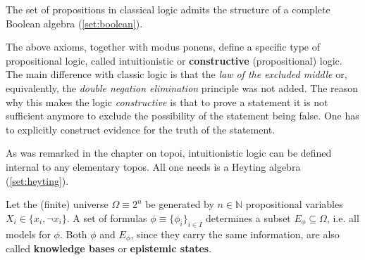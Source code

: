     \begin{property}\label{type:boolean_logic}
        The set of propositions in classical logic admits the structure of a complete Boolean algebra (\cref{set:boolean}).
    \end{property}

    \begin{remark}
        The above axioms, together with modus ponens, define a specific type of propositional logic, called intuitionistic or \textbf{constructive} (propositional) logic. The main difference with classic logic is that the \textit{law of the excluded middle} or, equivalently, the \textit{double negation elimination} principle was not added. The reason why this makes the logic \textit{constructive} is that to prove a statement it is not sufficient anymore to exclude the possibility of the statement being false. One has to explicitly construct evidence for the truth of the statement.

        As was remarked in the chapter on topoi, intuitionistic logic can be defined internal to any elementary topos. All one needs is a Heyting algebra (\cref{set:heyting}).
        
    \end{remark}


    Let the (finite) universe $\Omega\equiv 2^n$ be generated by $n\in\mathbb{N}$ propositional variables $X_i\in\{x_i,\lnot x_i\}$. A set of formulas $\phi\equiv\{\phi_i\}_{i\in I}$ determines a subset $E_\phi\subseteq\Omega$, i.e. all models for $\phi$. Both $\phi$ and $E_\phi$, since they carry the same information, are also called \textbf{knowledge bases} or \textbf{epistemic states}.


